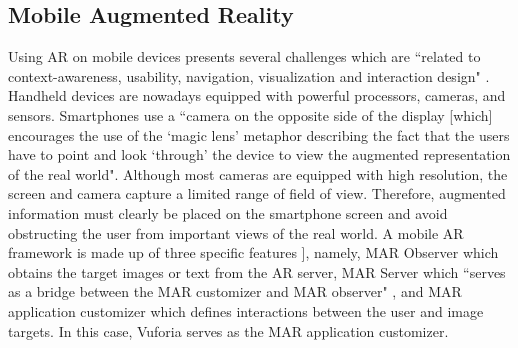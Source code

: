 \documentclass{aifyp}
\begin{document}
\subsection{Mobile Augmented Reality}
Using AR on mobile devices presents several challenges which are ``related to context-awareness, usability, navigation, visualization and interaction design" \cite{IssuesMobileAR}. Handheld devices are nowadays equipped with powerful processors, cameras, and sensors. Smartphones use a ``camera on the opposite side of the display [which] encourages the use of the ‘magic lens’ metaphor describing the fact that the users have to point and look ‘through’ the device to view the augmented representation of the real world"\cite{IssuesMobileAR}. Although most cameras are equipped with high resolution, the screen and camera capture a limited range of field of view. Therefore, augmented information must clearly be placed on the smartphone screen and avoid obstructing the user from important views of the real world.
\newline
\newline
\indent A mobile AR framework is made up of three specific features \cite{phdthesisMobileAR}], namely, MAR Observer which obtains the target images or text from the AR server, MAR Server which ``serves as a bridge between the MAR customizer and MAR observer" \cite{phdthesisMobileAR}, and MAR application customizer which defines interactions between the user and image targets. In this case, Vuforia serves as the MAR application customizer.
\end{document}
